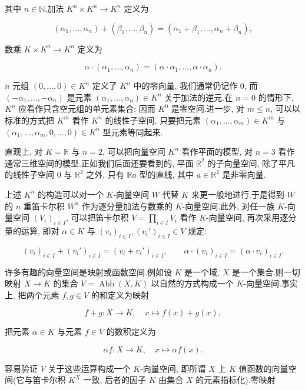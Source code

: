 其中 $n \in \mathbb{N}$.加法 $K^n \times K^n \longrightarrow K^n$ 定义为

\[
(\alpha_1, \ldots, \alpha_n) + (\beta_1, \ldots, \beta_n) = (\alpha_1 + \beta_1, \ldots, \alpha_n + \beta_n),
\]

数乘 $K \times K^n \longrightarrow K^n$ 定义为

\[
\alpha \cdot (\alpha_1, \ldots, \alpha_n) = (\alpha \cdot \alpha_1, \ldots, \alpha \cdot \alpha_n)\text{.}
\]

$n$ 元组 $(0, \ldots, 0) \in K^n$ 定义了 $K^n$ 中的零向量, 我们通常仍记作 $0$, 而 $\left(-\alpha_1, \ldots, -\alpha_n\right)$ 是元素 $(\alpha_1, \ldots, \alpha_n) \in K^n$ 关于加法的逆元.在 $n = 0$ 的情形下, $K^n$ 应看作只含空元组的单元素集合; 因而 $K^0$ 是零空间.进一步, 对 $m \leq n$, 可以以标准的方式把 $K^m$ 看作 $K^n$ 的线性子空间, 只要把元素 $(\alpha_1, \ldots, \alpha_m) \in K^m$ 与 $( \alpha_1, \ldots, \alpha_m, 0, \ldots, 0) \in K^n$ 型元素等同起来.

直观上, 对 $K = \mathbb{R}$ 与 $n = 2$, 可以把向量空间 $K^n$ 看作平面的模型, 对 $n = 3$ 看作通常三维空间的模型.正如我们后面还要看到的, 平面 $\mathbb{R}^2$ 的子向量空间, 除了平凡的线性子空间 $0$ 与 $\mathbb{R}^2$ 之外, 只有 $\mathbb{R}a$ 型的直线, 其中 $a \in \mathbb{R}^2$ 是非零向量.

上述 $K^n$ 的构造可以对一个 $K$-向量空间 $W$ 代替 $K$ 来更一般地进行.于是得到 $W$ 的 $n$ 重笛卡尔积 $W^n$ 作为逐分量加法与数乘的 $K$-向量空间.此外, 对任一族 $K$-向量空间 $(V_i)_{i \in I}$, 可以把笛卡尔积 $V = \prod_{i \in I} V_i$ 看作 $K$-向量空间, 再次采用逐分量的运算, 即对 $\alpha \in K$ 与 $(v_i)_{i \in I}, (v_i')_{i \in I} \in V$ 规定:

\[
(v_i)_{i \in I} + (v_i')_{i \in I} = (v_i + v_i')_{i \in I}, \qquad
\alpha \cdot (v_i)_{i \in I} = (\alpha \cdot v_i)_{i \in I}\text{.}
\]

许多有趣的向量空间是映射或函数空间.例如设 $K$ 是一个域, $X$ 是一个集合.则一切映射 $X \longrightarrow K$ 的集合 $V = \operatorname{Abb}(X, K)$ 以自然的方式构成一个 $K$-向量空间.事实上, 把两个元素 $f, g \in V$ 的和定义为映射

\[
f + g \colon X \longrightarrow K, \quad x \longmapsto f(x) + g(x),
\]

把元素 $\alpha \in K$ 与元素 $f \in V$ 的数积定义为

\[
\alpha f \colon X \longrightarrow K, \quad x \longmapsto \alpha f(x)\text{.}
\]

容易验证 $V$ 关于这些运算构成一个 $K$-向量空间, 即所谓 $X$ 上 $K$ 值函数的向量空间(它与笛卡尔积 $K^X$ 一致, 后者的因子 $K$ 由集合 $X$ 的元素指标化).零映射

